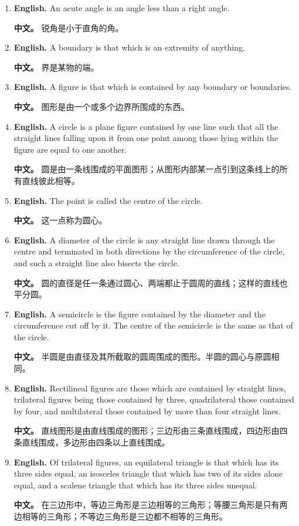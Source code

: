 \begin{enumerate}
\item \textbf{English.} An acute angle is an angle less than a right angle. \par\textbf{中文。} 锐角是小于直角的角。
\item \textbf{English.} A boundary is that which is an extremity of anything. \par\textbf{中文。} 界是某物的端。
\item \textbf{English.} A figure is that which is contained by any boundary or boundaries. \par\textbf{中文。} 图形是由一个或多个边界所围成的东西。
\item \textbf{English.} A circle is a plane figure contained by one line such that all the straight lines falling upon it from one point among those lying within the figure are equal to one another. \par\textbf{中文。} 圆是由一条线围成的平面图形；从图形内部某一点引到这条线上的所有直线彼此相等。
\item \textbf{English.} The point is called the centre of the circle. \par\textbf{中文。} 这一点称为圆心。
\item \textbf{English.} A diameter of the circle is any straight line drawn through the centre and terminated in both directions by the circumference of the circle, and such a straight line also bisects the circle. \par\textbf{中文。} 圆的直径是任一条通过圆心、两端都止于圆周的直线；这样的直线也平分圆。
\item \textbf{English.} A semicircle is the figure contained by the diameter and the circumference cut off by it. The centre of the semicircle is the same as that of the circle. \par\textbf{中文。} 半圆是由直径及其所截取的圆周围成的图形。半圆的圆心与原圆相同。
\item \textbf{English.} Rectilineal figures are those which are contained by straight lines, trilateral figures being those contained by three, quadrilateral those contained by four, and multilateral those contained by more than four straight lines. \par\textbf{中文。} 直线图形是由直线围成的图形；三边形由三条直线围成，四边形由四条直线围成，多边形由四条以上直线围成。
\item \textbf{English.} Of trilateral figures, an equilateral triangle is that which has its three sides equal, an isosceles triangle that which has two of its sides alone equal, and a scalene triangle that which has its three sides unequal. \par\textbf{中文。} 在三边形中，等边三角形是三边相等的三角形；等腰三角形是只有两边相等的三角形；不等边三角形是三边都不相等的三角形。

\end{enumerate}
